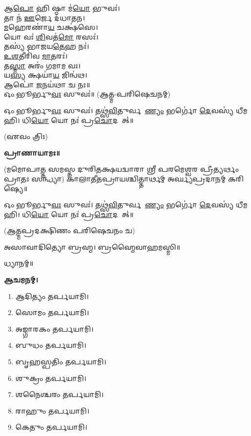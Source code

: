 𑌆\ul{𑌪𑍋} 𑌹𑌿 𑌷𑍍𑌠𑌾 𑌮॑\ul{𑌯𑍋} 𑌭𑍁𑌵𑌃॑।\\
𑌤𑌾 𑌨॑ \ul{𑌊}𑌰𑍍𑌜𑍇 𑌦॑𑌧𑌾𑌤𑌨।\\
\ul{𑌮}𑌹𑍇𑌰𑌣𑌾॑\ul{𑌯} 𑌚𑌕𑍍𑌷॑𑌸𑍇।\\
𑌯𑍋 𑌵𑌃॑ \ul{𑌶𑌿}𑌵𑌤॑\ul{𑌮𑍋} 𑌰𑌸𑌃॑।\\
𑌤𑌸𑍍𑌯॑ 𑌭𑌾𑌜𑌯\ul{𑌤𑍇}𑌹 𑌨𑌃॑।\\
\ul{𑌉}\ul{𑌶}𑌤𑍀𑌰𑌿॑𑌵 \ul{𑌮𑌾}𑌤𑌰𑌃॑।\\
𑌤\ul{𑌸𑍍𑌮𑌾} 𑌅𑌰𑌂॑ 𑌗𑌮𑌾𑌮 𑌵𑌃।\\
𑌯\ul{𑌸𑍍𑌯} 𑌕𑍍𑌷𑌯𑌾॑\ul{𑌯} 𑌜𑌿𑌨𑍍𑌵॑𑌥।\\
𑌆𑌪𑍋॑ \ul{𑌜}𑌨𑌯॑𑌥𑌾 𑌚 𑌨𑌃॥\\

𑌓𑌂 𑌭𑍂𑌰𑍍𑌭𑍁\ul{𑌵𑌃} 𑌸𑍁𑌵𑌃॑॥ (𑌆𑌤𑍍𑌮-𑌪𑌰𑌿𑌷𑍇𑌚𑌨𑌮𑍍)



𑌓𑌂 𑌭𑍂𑌰𑍍𑌭𑍁\ul{𑌵𑌃} 𑌸𑍁𑌵𑌃॑। 𑌤𑌥𑍍𑌸॑\ul{𑌵𑌿}𑌤𑍁𑌰𑍍𑌵𑌰𑍇᳚\ul{𑌣𑍍𑌯𑌂} 𑌭𑌰𑍍𑌗𑍋॑ \ul{𑌦𑍇}𑌵𑌸𑍍𑌯॑ 𑌧𑍀𑌮𑌹𑌿। 𑌧𑌿\ul{𑌯𑍋} 𑌯𑍋 𑌨𑌃॑ 𑌪𑍍𑌰\ul{𑌚𑍋}𑌦𑌯𑌾᳚𑌤𑍍॥

\hfill{(𑌏𑌵𑌂 𑌤𑍍𑌰𑌿𑌃)}


\textbf{𑌪𑍍𑌰𑌾𑌣𑌾𑌯𑌾𑌮𑌃॥}

(𑌮𑌮𑍋𑌪𑌾𑌤𑍍𑌤 𑌸𑌮𑌸𑍍𑌤 𑌦𑍁𑌰𑌿𑌤𑌕𑍍𑌷𑌯𑌦𑍍𑌵𑌾𑌰𑌾 𑌶𑍍𑌰𑍀 𑌪𑌰𑌮𑍇𑌶𑍍𑌵𑌰 𑌪𑍍𑌰𑍀𑌤𑍍𑌯𑌰𑍍𑌥𑌂 𑌪𑍍𑌰𑌾𑌤𑌃 𑌸𑌨𑍍𑌧𑍍𑌯𑌾)
𑌕𑌾𑌲𑌾𑌤𑍀𑌤𑌪𑍍𑌰𑌾𑌯𑌶𑍍𑌚𑌿𑌤𑍍𑌤𑌾𑌰𑍍𑌥𑌮𑍍 𑌅𑌰𑍍𑌘𑍍𑌯𑌪𑍍𑌰𑌦𑌾𑌨𑌮𑍍 𑌕𑌰𑌿𑌷𑍍𑌯𑍇॥

𑌓𑌂 𑌭𑍂𑌰𑍍𑌭𑍁\ul{𑌵𑌃} 𑌸𑍁𑌵𑌃॑। 𑌤𑌥𑍍𑌸॑\ul{𑌵𑌿}𑌤𑍁𑌰𑍍𑌵𑌰𑍇᳚\ul{𑌣𑍍𑌯𑌂} 𑌭𑌰𑍍𑌗𑍋॑ \ul{𑌦𑍇}𑌵𑌸𑍍𑌯॑ 𑌧𑍀𑌮𑌹𑌿। 𑌧𑌿\ul{𑌯𑍋} 𑌯𑍋 𑌨𑌃॑ 𑌪𑍍𑌰\ul{𑌚𑍋}𑌦𑌯𑌾᳚𑌤𑍍॥

(𑌆𑌤𑍍𑌮𑌪𑍍𑌰𑌦𑌕𑍍𑌷𑌿𑌣𑌂 𑌪𑌰𑌿𑌷𑍇𑌚𑌨𑌂 𑌚)


𑌅𑌸𑌾𑌵𑌾𑌦𑌿𑌤𑍍𑌯𑍋 𑌬𑍍𑌰𑌹𑍍𑌮। 𑌬𑍍𑌰𑌹𑍍𑌮𑍈𑌵𑌾𑌹𑌮𑌸𑍍𑌮𑌿॥

𑌧𑍍𑌯𑌾𑌨𑌮𑍍॥

\textbf{𑌆𑌚𑌮𑌨𑌮𑍍।}



\begin{enumerate}
 \item 𑌆𑌦𑌿𑌤𑍍𑌯𑌂 𑌤𑌰𑍍𑌪𑌯𑌾𑌮𑌿।
 \item 𑌸𑍋𑌮𑌂 𑌤𑌰𑍍𑌪𑌯𑌾𑌮𑌿।
 \item 𑌅𑌙𑍍𑌗𑌾𑌰𑌕𑌂 𑌤𑌰𑍍𑌪𑌯𑌾𑌮𑌿।
 \item 𑌬𑍁𑌧𑌂 𑌤𑌰𑍍𑌪𑌯𑌾𑌮𑌿।
 \item 𑌬𑍃𑌹𑌸𑍍𑌪𑌤𑌿𑌂 𑌤𑌰𑍍𑌪𑌯𑌾𑌮𑌿।
 \item 𑌶𑍁𑌕𑍍𑌰𑌂 𑌤𑌰𑍍𑌪𑌯𑌾𑌮𑌿।
 \item 𑌶𑌨𑍈𑌶𑍍𑌚𑌰𑌂 𑌤𑌰𑍍𑌪𑌯𑌾𑌮𑌿।
 \item 𑌰𑌾𑌹𑍁𑌂 𑌤𑌰𑍍𑌪𑌯𑌾𑌮𑌿।
 \item 𑌕𑍇𑌤𑍁𑌂 𑌤𑌰𑍍𑌪𑌯𑌾𑌮𑌿।
\end{enumerate}

